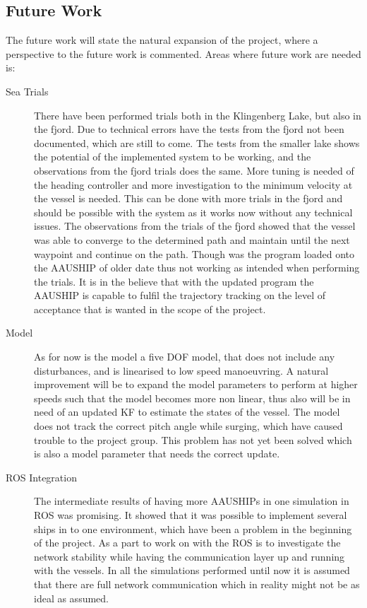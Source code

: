 \subsection{Future Work}
The future work will state the natural expansion of the project, where a perspective to the future work is commented. Areas where future work are needed is:
\begin{description}
\item[Sea Trials] There have been performed trials both in the Klingenberg Lake, but also in the fjord. Due to technical errors have the tests from the fjord not been documented, which are still to come. The tests from the smaller lake shows the potential of the implemented system to be working, and the observations from the fjord trials does the same. More tuning is needed of the heading controller and more investigation to the minimum velocity at the vessel is needed. This can be done with more trials in the fjord and should be possible with the system as it works now without any technical issues. The observations from the trials of the fjord showed that the vessel was able to converge to the determined path and maintain until the next waypoint and continue on the path. Though was the program loaded onto the AAUSHIP of older date thus not working as intended when performing the trials. It is in the believe that with the updated program the AAUSHIP is capable to fulfil the trajectory tracking on the level of acceptance that is wanted in the scope of the project.
\item[Model] As for now is the model a five \ac{DOF} model, that does not include any disturbances, and is linearised to low speed manoeuvring. A natural improvement will be to expand the model parameters to perform at higher speeds such that the model becomes more non linear, thus also will be in need of an updated \ac{KF} to estimate the states of the vessel. The model does not track the correct pitch angle while surging, which have caused trouble to the project group. This problem has not yet been solved which is also a model parameter that needs the correct update.
\item[ROS Integration] The intermediate results of having more AAUSHIPs in one simulation in \ac{ROS} was promising. It showed that it was possible to implement several ships in to one environment, which have been a problem in the beginning of the project. As a part to work on with the \ac{ROS} is to investigate the network stability while having the communication layer up and running with the vessels. In all the simulations performed until now it is assumed that there are full network communication which in reality might not be as ideal as assumed.

\end{description}
